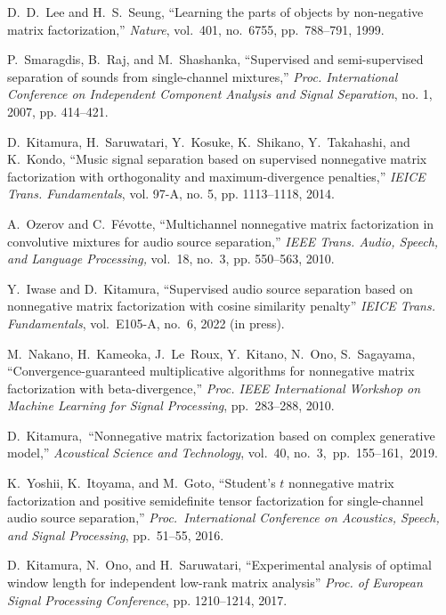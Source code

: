 \documentclass[honka]{nitkagawathesis}%
\begin{document}
\begin{thebibliography}{99}
  D.~D.~Lee and H.~S.~Seung,
  ``Learning the parts of objects by non-negative matrix factorization,''
  {\em Nature}, vol.~401, no.~6755, pp.~788--791, 1999.

  P.~Smaragdis, B.~Raj, and M.~Shashanka, 
  ``Supervised and semi-supervised separation of sounds from single-channel mixtures,''  
 {\em Proc. International Conference on Independent Component Analysis and Signal Separation}, no. 1, 2007, pp. 414–421.
  
  D.~Kitamura, H.~Saruwatari, Y.~Kosuke, K.~Shikano, Y.~Takahashi, and K.~Kondo, 
  ``Music signal separation based on supervised nonnegative matrix factorization with orthogonality and maximum-divergence penalties,'' 
  {\em IEICE Trans. Fundamentals}, vol. 97-A, no. 5, pp. 1113–1118, 2014.
  
  A.~Ozerov and C.~Févotte,
  ``Multichannel nonnegative matrix factorization in convolutive mixtures for audio source separation,'' 
  {\em IEEE Trans. Audio, Speech, and Language Processing,} vol.~18, no.~3, pp. 550--563, 2010.

  Y.~Iwase and D.~Kitamura, 
  ``Supervised audio source separation based on nonnegative matrix factorization with cosine similarity penalty''
  {\em IEICE Trans. Fundamentals}, vol.~E105-A, no.~6, 2022 (in press).

  M.~Nakano, H.~Kameoka, J.~Le~Roux, Y.~Kitano, N.~Ono, S.~Sagayama, ``Convergence-guaranteed multiplicative algorithms for nonnegative matrix factorization with beta-divergence,''
  {\em Proc. IEEE International Workshop on Machine Learning for Signal Processing}, pp.~283--288, 2010.

  D.~Kitamura,~``Nonnegative matrix factorization based on complex generative model,''
  {\em Acoustical Science and Technology}, vol.~40, no.~3,~pp.~155--161,~2019.

  K.~Yoshii, K.~Itoyama, and M.~Goto, ``Student's $t$ nonnegative matrix factorization and positive semidefinite tensor    
  factorization for single-channel audio source separation,''
  {\em Proc.~International Conference on Acoustics, Speech, and Signal Processing}, pp.~51--55, 2016.
  
  D.~Kitamura, N.~Ono, and H.~Saruwatari, 
  ``Experimental analysis of optimal window length for independent low-rank matrix analysis'' 
  {\em Proc. of European Signal Processing Conference}, pp. 1210–1214, 2017.

\end{thebibliography}
% 


\appendix

%
\end{document}
